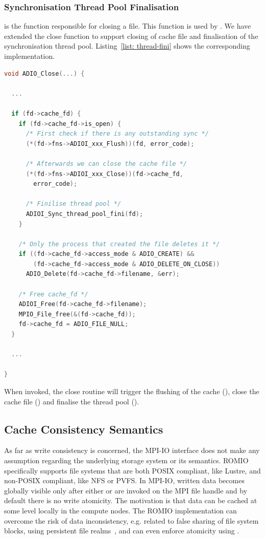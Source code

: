 \subsubsection{Synchronisation Thread Pool Finalisation}
\label{subsubsec: thread-pool-fini}
 is the function responsible for closing a file. This function is used by . We have extended the close function to support closing of cache file and finalisation of the synchronisation thread pool. Listing~\ref{list: thread-fini} shows the corresponding implementation.

\begin{lstlisting}[language=C, caption=Synchronisation Thread Pool Finalisation, label={list: thread-fini}]
void ADIO_Close(...) {

  ...

  if (fd->cache_fd) {
    if (fd->cache_fd->is_open) {
      /* First check if there is any outstanding sync */
      (*(fd->fns->ADIOI_xxx_Flush))(fd, error_code);

      /* Afterwards we can close the cache file */
      (*(fd->fns->ADIOI_xxx_Close))(fd->cache_fd, 
        error_code);

      /* Finilise thread pool */
      ADIOI_Sync_thread_pool_fini(fd);
    }

    /* Only the process that created the file deletes it */
    if ((fd->cache_fd->access_mode & ADIO_CREATE) &&
        (fd->cache_fd->access_mode & ADIO_DELETE_ON_CLOSE))
      ADIO_Delete(fd->cache_fd->filename, &err);

    /* Free cache_fd */
    ADIOI_Free(fd->cache_fd->filename);
    MPIO_File_free(&(fd->cache_fd));
    fd->cache_fd = ADIO_FILE_NULL;
  }

  ...

}
\end{lstlisting}

When invoked, the close routine will trigger the flushing of the cache (), close the cache file () and finalise the thread pool ().

\subsection{Cache Consistency Semantics}
\label{subsec: consistency}
As far as write consistency is concerned, the MPI-IO interface does not make any assumption regarding the underlying storage system or its semantics. ROMIO specifically supports file systems that are both POSIX compliant, like Lustre, and non-POSIX compliant, like NFS or PVFS. In MPI-IO, written data becomes globally visible only after either  or  are invoked on the MPI file handle and by default there is no write atomicity. The motivation is that data can be cached at some level locally in the compute nodes. The ROMIO implementation can overcome the risk of data inconsistency, e.g. related to false sharing of file system blocks, using persistent file realms~\cite{ColomaCWWRP04}, and can even enforce atomicity using .

